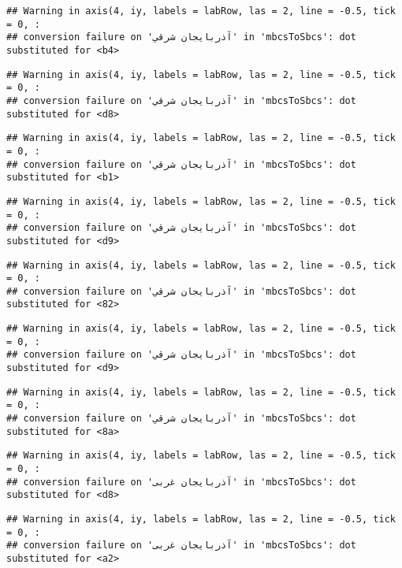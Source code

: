 \documentclass[
]{article}
\begin{document}
\begin{verbatim}
## Warning in axis(4, iy, labels = labRow, las = 2, line = -0.5, tick = 0, :
## conversion failure on 'آذربايجان شرقي' in 'mbcsToSbcs': dot substituted for <b4>
\end{verbatim}

\begin{verbatim}
## Warning in axis(4, iy, labels = labRow, las = 2, line = -0.5, tick = 0, :
## conversion failure on 'آذربايجان شرقي' in 'mbcsToSbcs': dot substituted for <d8>
\end{verbatim}

\begin{verbatim}
## Warning in axis(4, iy, labels = labRow, las = 2, line = -0.5, tick = 0, :
## conversion failure on 'آذربايجان شرقي' in 'mbcsToSbcs': dot substituted for <b1>
\end{verbatim}

\begin{verbatim}
## Warning in axis(4, iy, labels = labRow, las = 2, line = -0.5, tick = 0, :
## conversion failure on 'آذربايجان شرقي' in 'mbcsToSbcs': dot substituted for <d9>
\end{verbatim}

\begin{verbatim}
## Warning in axis(4, iy, labels = labRow, las = 2, line = -0.5, tick = 0, :
## conversion failure on 'آذربايجان شرقي' in 'mbcsToSbcs': dot substituted for <82>
\end{verbatim}

\begin{verbatim}
## Warning in axis(4, iy, labels = labRow, las = 2, line = -0.5, tick = 0, :
## conversion failure on 'آذربايجان شرقي' in 'mbcsToSbcs': dot substituted for <d9>
\end{verbatim}

\begin{verbatim}
## Warning in axis(4, iy, labels = labRow, las = 2, line = -0.5, tick = 0, :
## conversion failure on 'آذربايجان شرقي' in 'mbcsToSbcs': dot substituted for <8a>
\end{verbatim}

\begin{verbatim}
## Warning in axis(4, iy, labels = labRow, las = 2, line = -0.5, tick = 0, :
## conversion failure on 'آذربايجان غربی' in 'mbcsToSbcs': dot substituted for <d8>
\end{verbatim}

\begin{verbatim}
## Warning in axis(4, iy, labels = labRow, las = 2, line = -0.5, tick = 0, :
## conversion failure on 'آذربايجان غربی' in 'mbcsToSbcs': dot substituted for <a2>
\end{verbatim}
\end{document}

